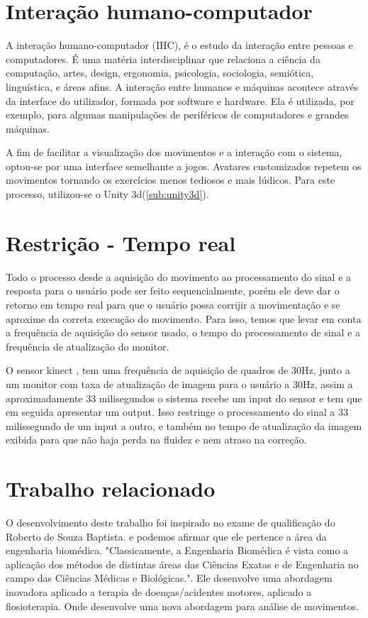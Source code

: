   \section{Interação humano-computador}
  \label{sec:ihc}
  A interação humano-computador (IHC), é o estudo da interação entre pessoas e computadores.
  É uma matéria interdisciplinar que relaciona a ciência da computação,
  artes, design, ergonomia, psicologia, sociologia, semiótica, linguística, e áreas afins.
  A interação entre humanos e máquinas acontece através da interface do utilizador,
  formada por software e hardware. Ela é utilizada, por exemplo, para algumas manipulações
  de periféricos de computadores e grandes máquinas\cite{ihc}.

  A fim de facilitar a visualização dos movimentos e a interação com o sistema, optou-se por uma interface semelhante a jogos.
  Avatares customizados repetem os movimentos tornando os exercícios menos tediosos e mais lúdicos. Para este processo, utilizou-se
  o Unity 3d(\ref{sub:unity3d}).

  \section{Restrição - Tempo real}
  \label{sec:restrição}
    Todo o processo desde a aquisição do movimento ao processamento do sinal e a
  resposta para o usuário pode ser feito sequencialmente, porém ele deve dar o
  retorno em tempo real para que o usuário possa corrijir a movimentação e se
  aproxime da correta execução do movimento. Para isso, temos que levar em conta
  a frequência de aquisição do sensor usado, o tempo do processamento de sinal e
  a frequência de atualização do monitor.

    O sensor kinect \cite{microsoftResearch}, tem uma frequência de
  aquisição de quadros de 30Hz, junto a um monitor com taxa de atualização de imagem
  para o usuário a 30Hz, assim a aproximadamente 33 milisegundos o
  sistema recebe um input do sensor e tem que em seguida apresentar um output. Isso
   restringe o processamento do sinal a 33 milissegundo de um input a outro, e
  também no tempo de atualização da imagem exibida para que não haja perda na
  fluidez e nem atraso na correção.

  \section{Trabalho relacionado}
  \label{Sec:MetCondTCC}
    O desenvolvimento deste trabalho foi inspirado no exame de qualificação do Roberto de Souza Baptista\cite{roberto}.
  e podemos afirmar que ele pertence a área da engenharia biomédica. "Classicamente,
  a Engenharia Biomédica é vista como a aplicação dos métodos de distintas áreas
  das Ciências Exatas e de Engenharia no campo das Ciências Médicas e
  Biológicas."\cite{engenhariaBiomedica}. Ele desenvolve uma abordagem
  inovadora aplicado a terapia de  doenças/acidentes motores, aplicado a
   fiosioterapia. Onde desenvolve uma nova abordagem para análise de movimentos.

